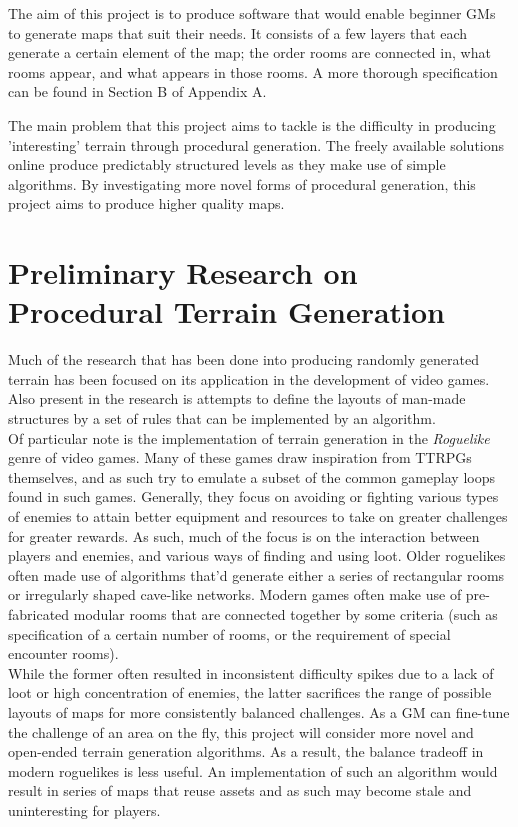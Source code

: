 \documentclass{article}
\begin{document}
The aim of this project is to produce software that would enable beginner GMs to generate maps that suit their needs. It consists of a few layers that each generate a certain element of the map; the order rooms are connected in, what rooms appear, and what appears in those rooms. A more thorough specification can be found in Section B of Appendix A.



The main problem that this project aims to tackle is the difficulty in producing 'interesting' terrain through procedural generation. The freely available solutions online produce predictably structured levels as they make use of simple algorithms. By investigating more novel forms of procedural generation, this project aims to produce higher quality maps. 


\section{Preliminary Research on Procedural Terrain Generation}
Much of the research that has been done into producing randomly generated terrain has been focused on its application in the development of video games. Also present in the research is attempts to define the layouts of man-made structures by a set of rules that can be implemented by an algorithm. \\

Of particular note is the implementation of terrain generation in the \textit{Roguelike} genre of video games. Many of these games draw inspiration from TTRPGs themselves, and as such try to emulate a subset of the common gameplay loops found in such games. Generally, they focus on avoiding or fighting various types of enemies to attain better equipment and resources to take on greater challenges for greater rewards. As such, much of the focus is on the interaction between players and enemies, and various ways of finding and using loot. Older roguelikes often made use of algorithms that'd generate either a series of rectangular rooms or irregularly shaped cave-like networks. Modern games often make use of pre-fabricated modular rooms that are connected together by some criteria (such as specification of a certain number of rooms, or the requirement of special encounter rooms).\\ 




While the former often resulted in inconsistent difficulty spikes due to a lack of loot or high concentration of enemies, the latter sacrifices the range of possible layouts of maps for more consistently balanced challenges. As a GM can fine-tune the challenge of an area on the fly, this project will consider more novel and open-ended terrain generation algorithms. As a result, the balance tradeoff in modern roguelikes is less useful. An implementation of such an algorithm would result in series of maps that reuse assets and as such may become stale and uninteresting for players.\\
\end{document}
